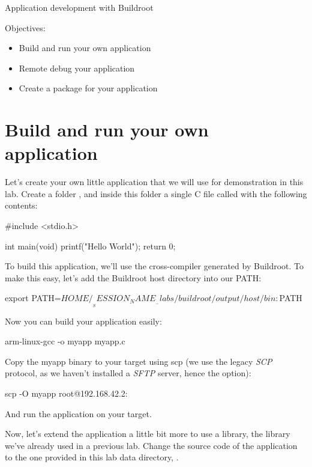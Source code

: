 \subchapter
{Application development with Buildroot}
{Objectives:
  \begin{itemize}
  \item Build and run your own application
  \item Remote debug your application
  \item Create a package for your application
  \end{itemize}
}

\section{Build and run your own application}

Let's create your own little application that we will use for
demonstration in this lab. Create a folder ,
and inside this folder a single C file called  with the
following contents:

\begin{fileinput}
#include <stdio.h>

int main(void) {
        printf("Hello World\n");
        return 0;
}
\end{fileinput}

To build this application, we'll use the cross-compiler generated by
Buildroot. To make this easy, let's add the Buildroot host directory
into our PATH:

\begin{bashinput}
export PATH=$HOME/__SESSION_NAME__-labs/buildroot/output/host/bin:$PATH
\end{bashinput}

Now you can build your application easily:

\begin{bashinput}
arm-linux-gcc -o myapp myapp.c
\end{bashinput}

Copy the myapp binary to your target using scp (we use the legacy {\em
SCP} protocol, as we haven't installed a {\em SFTP} server, hence
the  option):

\begin{bashinput}
scp -O myapp root@192.168.42.2:
\end{bashinput}

And run the  application on your target.

Now, let's extend the application a little bit more to use a library,
the  library we've already used in a previous
lab. Change the source code of the application to the one provided in
this lab data directory, .

